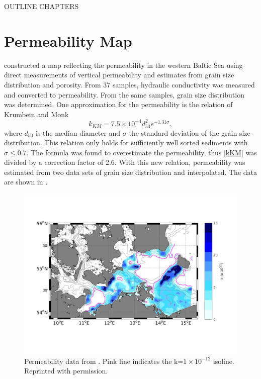 OUTLINE CHAPTERS

\section{Permeability Map}

\cite{forster2003} constructed a map reflecting the permeability in the western 
Baltic Sea using direct measurements of vertical permeability and estimates 
from grain size distribution and porosity. From 37 samples, hydraulic 
conductivity was measured and converted to permeability. From the same samples, 
grain size distribution was determined. One approximation for the permeability 
is the relation of Krumbein and Monk \citep[][]{krumbein1942}
\begin{equation}
 \label{kKM}
 k_{KM} = 7.5 \times 10^{-4} d_{50}^2 e^{-1.31 \sigma},
\end{equation}
where $d_{50}$ is the median diameter and $\sigma$ the standard deviation of 
the grain size distribution. This relation only holds for sufficiently well 
sorted sediments with $\sigma \leq 0.7$. The formula was found to overestimate 
the permeability, thus \eqref{kKM} was divided by a correction factor of 2.6.  
With this new relation, permeability was estimated from two data sets of grain 
size distribution and interpolated. The data are shown in .
\begin{figure}[ht]
 \includegraphics[width=16cm]{bilder/perm_k.png}
 \caption{Permeability data from \cite{forster2003}. Pink line indicates the 
k=$1\times10^{-12}$ isoline. Reprinted with permission. \label{perm}}
\end{figure}

